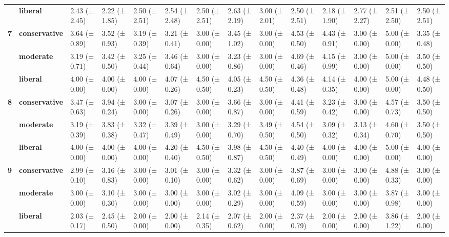 \begin{longtable}{llllllllllllll}
\textbf{} & \textbf{liberal} & 2.43 (± 2.45) & 2.22 (± 1.85) & 2.50 (± 2.51) & 2.54 (± 2.48) & 2.50 (± 2.51) & 2.63 (± 2.19) & 3.00 (± 2.01) & 2.50 (± 2.51) & 2.18 (± 1.90) & 2.77 (± 2.27) & 2.51 (± 2.50) & 2.50 (± 2.51) \\
\cline{1-14}
\multirow[t]{3}{*}{\textbf{7}} & \textbf{conservative} & 3.64 (± 0.89) & 3.52 (± 0.93) & 3.19 (± 0.39) & 3.21 (± 0.41) & 3.00 (± 0.00) & 3.45 (± 1.02) & 3.00 (± 0.00) & 4.53 (± 0.50) & 4.43 (± 0.91) & 3.00 (± 0.00) & 5.00 (± 0.00) & 3.35 (± 0.48) \\
\textbf{} & \textbf{moderate} & 3.19 (± 0.71) & 3.42 (± 0.50) & 3.25 (± 0.44) & 3.46 (± 0.64) & 3.00 (± 0.00) & 3.23 (± 0.86) & 3.00 (± 0.00) & 4.69 (± 0.46) & 4.15 (± 0.99) & 3.00 (± 0.00) & 5.00 (± 0.00) & 3.50 (± 0.50) \\
\textbf{} & \textbf{liberal} & 4.00 (± 0.00) & 4.00 (± 0.00) & 4.00 (± 0.00) & 4.07 (± 0.26) & 4.50 (± 0.50) & 4.05 (± 0.23) & 4.50 (± 0.50) & 4.36 (± 0.48) & 4.14 (± 0.35) & 4.00 (± 0.00) & 5.00 (± 0.00) & 4.48 (± 0.50) \\
\cline{1-14}
\multirow[t]{3}{*}{\textbf{8}} & \textbf{conservative} & 3.47 (± 0.63) & 3.94 (± 0.24) & 3.00 (± 0.00) & 3.07 (± 0.26) & 3.00 (± 0.00) & 3.66 (± 0.87) & 3.00 (± 0.00) & 4.41 (± 0.59) & 3.23 (± 0.42) & 3.00 (± 0.00) & 4.57 (± 0.73) & 3.50 (± 0.50) \\
\textbf{} & \textbf{moderate} & 3.19 (± 0.39) & 3.83 (± 0.38) & 3.32 (± 0.47) & 3.39 (± 0.49) & 3.00 (± 0.00) & 3.29 (± 0.70) & 3.49 (± 0.50) & 4.54 (± 0.50) & 3.09 (± 0.32) & 3.13 (± 0.34) & 4.60 (± 0.70) & 3.50 (± 0.50) \\
\textbf{} & \textbf{liberal} & 4.00 (± 0.00) & 4.00 (± 0.00) & 4.00 (± 0.00) & 4.20 (± 0.40) & 4.50 (± 0.50) & 3.98 (± 0.87) & 4.50 (± 0.50) & 4.40 (± 0.49) & 4.00 (± 0.00) & 4.00 (± 0.00) & 5.00 (± 0.00) & 4.00 (± 0.00) \\
\cline{1-14}
\multirow[t]{3}{*}{\textbf{9}} & \textbf{conservative} & 2.99 (± 0.10) & 3.16 (± 0.83) & 3.00 (± 0.00) & 3.01 (± 0.10) & 3.00 (± 0.00) & 3.32 (± 0.62) & 3.00 (± 0.00) & 3.87 (± 0.69) & 3.00 (± 0.00) & 3.00 (± 0.00) & 4.88 (± 0.33) & 3.00 (± 0.00) \\
\textbf{} & \textbf{moderate} & 3.00 (± 0.00) & 3.10 (± 0.30) & 3.00 (± 0.00) & 3.00 (± 0.00) & 3.00 (± 0.00) & 3.02 (± 0.29) & 3.00 (± 0.00) & 4.09 (± 0.59) & 3.00 (± 0.00) & 3.00 (± 0.00) & 3.87 (± 0.98) & 3.00 (± 0.00) \\
\textbf{} & \textbf{liberal} & 2.03 (± 0.17) & 2.45 (± 0.50) & 2.00 (± 0.00) & 2.00 (± 0.00) & 2.14 (± 0.35) & 2.07 (± 0.62) & 2.00 (± 0.00) & 2.37 (± 0.79) & 2.00 (± 0.00) & 2.00 (± 0.00) & 3.86 (± 1.22) & 2.00 (± 0.00) \\

\end{longtable}
